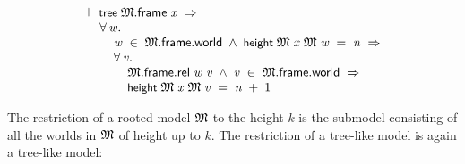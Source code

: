 \documentclass[letterpaper]{article}
\renewcommand{\HOLConst}[1]{{\textsf{\upshape\small #1}}}
\renewcommand{\HOLinline}[1]{\ensuremath{#1}}
\newenvironment{holmath}{\begin{displaymath}\begin{array}{l}}{\end{array}\end{displaymath}\ignorespacesafterend}
\begin{document}
\begin{holmath}
  \ensuremath{\HOLTokenTurnstile}\HOLConst{tree}\;\HOLFreeVar{\ensuremath{\mathfrak{M}}}.\HOLFieldName{frame}\;\HOLFreeVar{x}\;\HOLSymConst{\HOLTokenImp{}}\\
\;\;\;\;\;\HOLSymConst{\HOLTokenForall{}}\HOLBoundVar{w}.\\
\;\;\;\;\;\;\;\;\;\HOLBoundVar{w}\;\HOLSymConst{\HOLTokenIn{}}\;\HOLFreeVar{\ensuremath{\mathfrak{M}}}.\HOLFieldName{frame}.\HOLFieldName{world}\;\HOLSymConst{\HOLTokenConj{}}\;\HOLConst{height}\;\HOLFreeVar{\ensuremath{\mathfrak{M}}}\;\HOLFreeVar{x}\;\HOLFreeVar{\ensuremath{\mathfrak{M}}}\;\HOLBoundVar{w}\;\HOLSymConst{=}\;\HOLFreeVar{n}\;\HOLSymConst{\HOLTokenImp{}}\\
\;\;\;\;\;\;\;\;\;\HOLSymConst{\HOLTokenForall{}}\HOLBoundVar{v}.\\
\;\;\;\;\;\;\;\;\;\;\;\;\;\HOLFreeVar{\ensuremath{\mathfrak{M}}}.\HOLFieldName{frame}.\HOLFieldName{rel}\;\HOLBoundVar{w}\;\HOLBoundVar{v}\;\HOLSymConst{\HOLTokenConj{}}\;\HOLBoundVar{v}\;\HOLSymConst{\HOLTokenIn{}}\;\HOLFreeVar{\ensuremath{\mathfrak{M}}}.\HOLFieldName{frame}.\HOLFieldName{world}\;\HOLSymConst{\HOLTokenImp{}}\\
\;\;\;\;\;\;\;\;\;\;\;\;\;\HOLConst{height}\;\HOLFreeVar{\ensuremath{\mathfrak{M}}}\;\HOLFreeVar{x}\;\HOLFreeVar{\ensuremath{\mathfrak{M}}}\;\HOLBoundVar{v}\;\HOLSymConst{=}\;\HOLFreeVar{n}\;\HOLSymConst{\ensuremath{+}}\;\HOLNumLit{1}
\end{holmath}

The restriction of a rooted model \HOLinline{\HOLFreeVar{\ensuremath{\mathfrak{M}}}} to the height $k$ is the submodel consisting of all the worlds in \HOLinline{\HOLFreeVar{\ensuremath{\mathfrak{M}}}} of height up to $k$. The restriction of a tree-like model is again a tree-like model:
\end{document}
